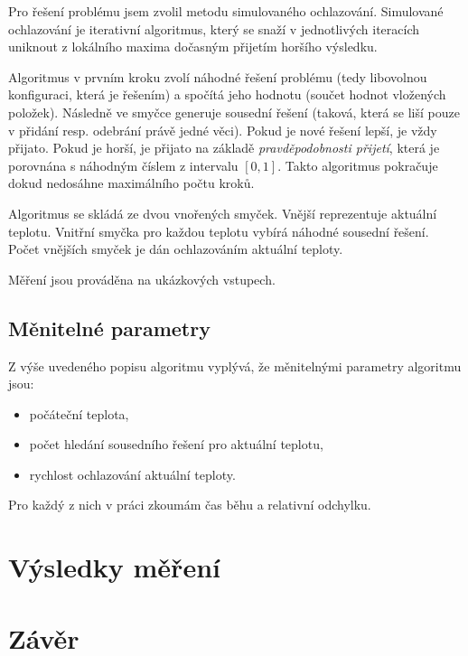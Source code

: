 \documentclass[czech]{article}
\begin{document}
Pro řešení problému jsem zvolil metodu simulovaného ochlazování.
Simulované ochlazování je iterativní algoritmus, který se snaží v jednotlivých iteracích uniknout z lokálního maxima dočasným přijetím horšího výsledku.

Algoritmus v prvním kroku zvolí náhodné řešení problému (tedy libovolnou konfiguraci, která je řešením) a spočítá jeho hodnotu (součet hodnot vložených položek).
Následně ve smyčce generuje sousední řešení (taková, která se liší pouze v přidání resp. odebrání právě jedné věci).
Pokud je nové řešení lepší, je vždy přijato.
Pokud je horší, je přijato na základě \textit{pravděpodobnosti přijetí}, která je porovnána s náhodným číslem z intervalu $[0, 1]$.
Takto algoritmus pokračuje dokud nedosáhne maximálního počtu kroků.

Algoritmus se skládá ze dvou vnořených smyček.
Vnější reprezentuje aktuální teplotu.
Vnitřní smyčka pro každou teplotu vybírá náhodné sousední řešení.
Počet vnějších smyček je dán ochlazováním aktuální teploty.

Měření jsou prováděna na ukázkových vstupech.

\subsection*{Měnitelné parametry}

Z výše uvedeného popisu algoritmu vyplývá, že měnitelnými parametry algoritmu jsou:

\begin{itemize}
    \item počáteční teplota,
    \item počet hledání sousedního řešení pro aktuální teplotu,
    \item rychlost ochlazování aktuální teploty.
\end{itemize}

Pro každý z nich v práci zkoumám čas běhu a relativní odchylku.

\section{Výsledky měření}

\section{Závěr}
\end{document}
